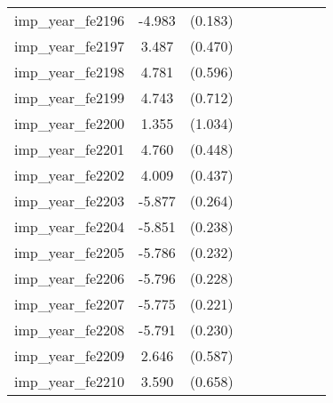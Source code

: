 {\begin{tabular}{l*{4}{cc}}
imp\_year\_fe2196&   -4.983\sym{***}&  (0.183)&                  &         &                  &         &                  &         \\
imp\_year\_fe2197&    3.487\sym{***}&  (0.470)&                  &         &                  &         &                  &         \\
imp\_year\_fe2198&    4.781\sym{***}&  (0.596)&                  &         &                  &         &                  &         \\
imp\_year\_fe2199&    4.743\sym{***}&  (0.712)&                  &         &                  &         &                  &         \\
imp\_year\_fe2200&    1.355         &  (1.034)&                  &         &                  &         &                  &         \\
imp\_year\_fe2201&    4.760\sym{***}&  (0.448)&                  &         &                  &         &                  &         \\
imp\_year\_fe2202&    4.009\sym{***}&  (0.437)&                  &         &                  &         &                  &         \\
imp\_year\_fe2203&   -5.877\sym{***}&  (0.264)&                  &         &                  &         &                  &         \\
imp\_year\_fe2204&   -5.851\sym{***}&  (0.238)&                  &         &                  &         &                  &         \\
imp\_year\_fe2205&   -5.786\sym{***}&  (0.232)&                  &         &                  &         &                  &         \\
imp\_year\_fe2206&   -5.796\sym{***}&  (0.228)&                  &         &                  &         &                  &         \\
imp\_year\_fe2207&   -5.775\sym{***}&  (0.221)&                  &         &                  &         &                  &         \\
imp\_year\_fe2208&   -5.791\sym{***}&  (0.230)&                  &         &                  &         &                  &         \\
imp\_year\_fe2209&    2.646\sym{***}&  (0.587)&                  &         &                  &         &                  &         \\
imp\_year\_fe2210&    3.590\sym{***}&  (0.658)&                  &         &                  &         &                  &         \\

\end{tabular}}
